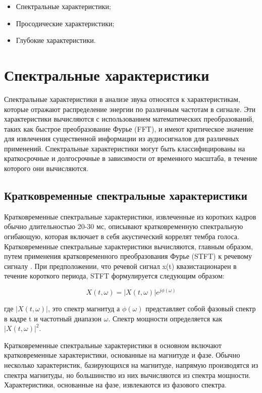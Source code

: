 \begin{itemize}
    \item Спектральные характеристики;
    \item Просодические характеристики;
    \item Глубокие характеристики.
\end{itemize}

\section{Спектральные характеристики}

Спектральные характеристики в анализе звука относятся к характеристикам, которые отражают распределение энергии по различным частотам в сигнале. Эти характеристики вычисляются с использованием математических преобразований, таких как быстрое преобразование Фурье (FFT), и имеют критическое значение для извлечения существенной информации из аудиосигналов для различных применений. Спектральные характеристики могут быть классифицированы на краткосрочные и долгосрочные в зависимости от временного масштаба, в течение которого они вычисляются.

\subsection{Кратковременные спектральные характеристики}

Кратковременные спектральные характеристики, извлеченные из коротких кадров обычно длительностью 20-30 мс, описывают кратковременную спектральную огибающую, которая включает в себя акустический коррелят тембра голоса. Кратковременные спектральные характеристики вычисляются, главным образом, путем применения кратковременного преобразования Фурье (STFT) к речевому сигналу \cite{xiao2015spoofing}. При предположении, что речевой сигнал x(t) квазистационарен в течение короткого периода, STFT формулируется следующим образом:


\begin{equation}
    X(t, \omega) = |X(t, \omega)| e^{j\phi(\omega)}
\end{equation}

где \(|X(t, \omega)|\), это спектр магнитуд а \(\phi(\omega)\) представляет собой фазовый спектр в кадре t и частотный диапазон \(\omega\). Спектр мощности определяется как \(|X(t, \omega)|^2\).

Кратковременные спектральные характеристики в основном включают кратковременные характеристики, основанные на магнитуде и фазе. Обычно несколько характеристик, базирующихся на магнитуде, напрямую производятся из спектра магнитуды, но большинство из них вычисляются из спектра мощности. Характеристики, основанные на фазе, извлекаются из фазового спектра.

